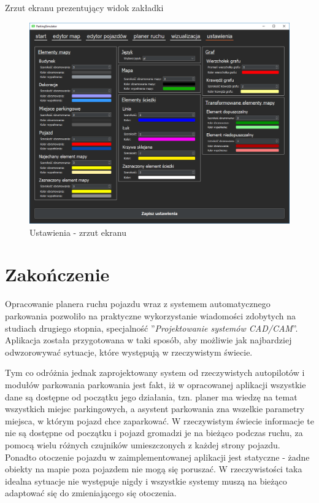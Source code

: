 \documentclass[a4paper,11pt,twoside]{report}
\theoremstyle{definition}
\begin{document}
Zrzut ekranu prezentujący widok zakładki 

\begin{figure}[h!]
\centering
\includegraphics[scale=0.5]{instructionSettings}
\caption[Ustawienia - zrzut ekranu]{Ustawienia - zrzut ekranu}
\end{figure}

\chapter{Zakończenie}

Opracowanie planera ruchu pojazdu wraz z systemem automatycznego parkowania pozwoliło na praktyczne wykorzystanie wiadomości zdobytych na studiach drugiego stopnia, specjalność ''\textit{Projektowanie systemów CAD/CAM}''. Aplikacja została przygotowana w taki sposób, aby możliwie jak najbardziej odwzorowywać sytuacje, które występują w rzeczywistym świecie. 

Tym co odróżnia jednak zaprojektowany system od rzeczywistych autopilotów i modułów parkowania parkowania jest fakt, iż w opracowanej aplikacji wszystkie dane są dostępne od początku jego działania, tzn. planer ma wiedzę na temat wszystkich miejsc parkingowych, a asystent parkowania zna wszelkie parametry miejsca, w którym pojazd chce zaparkować. W rzeczywistym świecie informacje te nie są dostępne od początku i pojazd gromadzi je na bieżąco podczas ruchu, za pomocą wielu różnych czujników umieszczonych z każdej strony pojazdu. Ponadto otoczenie pojazdu w zaimplementowanej aplikacji jest statyczne - żadne obiekty na mapie poza pojazdem nie mogą się poruszać. W rzeczywistości taka idealna sytuacje nie występuje nigdy i wszystkie systemy muszą na bieżąco adaptować się do zmieniającego się otoczenia.
\end{document}
